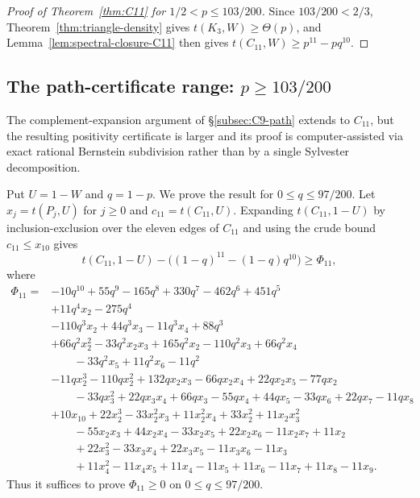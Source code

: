 \documentclass[11pt]{article}
\begin{document}
\begin{proof}[Proof of Theorem~\ref{thm:C11} for $1/2<p\le103/200$]
Since $103/200<2/3$, Theorem~\ref{thm:triangle-density} gives $t(K_3,W)\ge\Theta(p)$, and Lemma~\ref{lem:spectral-closure-C11} then gives $t(C_{11},W)\ge p^{11}-pq^{10}$.
\end{proof}

\subsection{The path-certificate range: $p\ge103/200$}\label{subsec:C11-path}

The complement-expansion argument of \S\ref{subsec:C9-path} extends to $C_{11}$, but the resulting positivity certificate is larger and its proof is computer-assisted via exact rational Bernstein subdivision rather than by a single Sylvester decomposition.

Put $U=1-W$ and $q=1-p$.  We prove the result for $0\le q\le 97/200$.  Let $x_j=t(P_j,U)$ for $j\ge0$ and $c_{11}=t(C_{11},U)$.  Expanding $t(C_{11},1-U)$ by inclusion-exclusion over the eleven edges of $C_{11}$ and using the crude bound $c_{11}\le x_{10}$ gives
\[
        t(C_{11},1-U)-\bigl((1-q)^{11}-(1-q)q^{10}\bigr)\ge\Phi_{11},
\]
where
\begin{equation}\label{eq:Phi11-path}
\begin{aligned}
\Phi_{11}={}&
-10q^{10}+55q^9-165q^8+330q^7-462q^6+451q^5 \\
&+11q^4x_2-275q^4 \\
&-110q^3x_2+44q^3x_3-11q^3x_4+88q^3 \\
&+66q^2x_2^2-33q^2x_2x_3+165q^2x_2-110q^2x_3+66q^2x_4 \\
&\qquad -33q^2x_5+11q^2x_6-11q^2 \\
&-11qx_2^3-110qx_2^2+132qx_2x_3-66qx_2x_4+22qx_2x_5-77qx_2 \\
&\qquad -33qx_3^2+22qx_3x_4+66qx_3-55qx_4+44qx_5-33qx_6+22qx_7-11qx_8 \\
&+10x_{10}+22x_2^3-33x_2^2x_3+11x_2^2x_4+33x_2^2+11x_2x_3^2 \\
&\qquad -55x_2x_3+44x_2x_4-33x_2x_5+22x_2x_6-11x_2x_7+11x_2 \\
&\qquad +22x_3^2-33x_3x_4+22x_3x_5-11x_3x_6-11x_3 \\
&\qquad +11x_4^2-11x_4x_5+11x_4-11x_5+11x_6-11x_7+11x_8-11x_9.
\end{aligned}
\end{equation}
Thus it suffices to prove $\Phi_{11}\ge0$ on $0\le q\le 97/200$.
\end{document}
